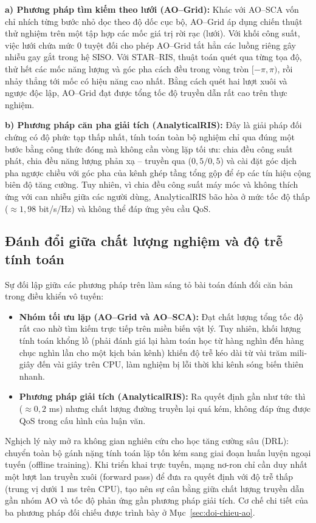 \textbf{a) Phương pháp tìm kiếm theo lưới (AO--Grid):} Khác với AO--SCA vốn chỉ nhích từng bước nhỏ dọc
theo độ dốc cục bộ, AO--Grid áp dụng chiến thuật thử nghiệm trên một tập hợp các mốc giá trị rời rạc
(lưới). Với khối công suất, việc lưới chứa mức $0$ tuyệt đối cho phép AO--Grid tắt hẳn các luồng riêng gây
nhiễu gay gắt trong hệ SISO. Với STAR--RIS, thuật toán quét qua từng tọa độ, thử hết các mốc năng lượng và
góc pha cách đều trong vòng tròn $[-\pi, \pi)$, rồi nhảy thẳng tới mốc có hiệu năng cao nhất. Bằng cách
quét hai lượt xuôi và ngược độc lập, AO--Grid đạt được tổng tốc độ truyền dẫn rất cao trên thực nghiệm.

\textbf{b) Phương pháp căn pha giải tích (AnalyticalRIS):} Đây là giải pháp đối chứng có độ phức tạp thấp
nhất, tính toán toàn bộ nghiệm chỉ qua đúng một bước bằng công thức đóng mà không cần vòng lặp tối ưu: chia
đều công suất phát, chia đều năng lượng phản xạ -- truyền qua ($0,5 / 0,5$) và cài đặt góc dịch pha ngược
chiều với góc pha của kênh ghép tầng tổng gộp để ép các tín hiệu cộng biên độ tăng cường. Tuy nhiên, vì
chia đều công suất máy móc và không thích ứng với can nhiễu giữa các người dùng, AnalyticalRIS bão hòa ở mức
tốc độ thấp ($\approx 1,98$ bit/s/Hz) và không thể đáp ứng yêu cầu QoS.

\subsection{Đánh đổi giữa chất lượng nghiệm và độ trễ tính toán}
\label{ssec:danh-doi-ly-thuyet}

Sự đối lập giữa các phương pháp trên làm sáng tỏ bài toán đánh đổi căn bản trong điều khiển vô tuyến:
\begin{itemize}
\item \textbf{Nhóm tối ưu lặp (AO--Grid và AO--SCA):} Đạt chất lượng tổng tốc độ rất cao nhờ tìm kiếm trực
  tiếp trên miền biến vật lý. Tuy nhiên, khối lượng tính toán khổng lồ (phải đánh giá lại hàm toán học từ
  hàng nghìn đến hàng chục nghìn lần cho một kịch bản kênh) khiến độ trễ kéo dài từ vài trăm mili-giây đến
  vài giây trên CPU, làm nghiệm bị lỗi thời khi kênh sóng biến thiên nhanh.
\item \textbf{Phương pháp giải tích (AnalyticalRIS):} Ra quyết định gần như tức thì ($\approx 0,2$ ms)
  nhưng chất lượng đường truyền lại quá kém, không đáp ứng được QoS trong cấu hình của luận văn.
\end{itemize}
Nghịch lý này mở ra không gian nghiên cứu cho học tăng cường sâu (DRL): chuyển toàn bộ gánh nặng tính toán
lặp tốn kém sang giai đoạn huấn luyện ngoại tuyến (offline training). Khi triển khai trực tuyến, mạng
nơ-ron chỉ cần duy nhất một lượt lan truyền xuôi (forward pass) để đưa ra quyết định với độ trễ thấp (trung
vị dưới 1 ms trên CPU), tạo nên sự cân bằng giữa chất lượng truyền dẫn gần nhóm AO và tốc độ phản ứng gần
phương pháp giải tích. Cơ chế chi tiết của ba phương pháp đối chiếu được trình bày ở
Mục~\ref{sec:doi-chieu-ao}.

